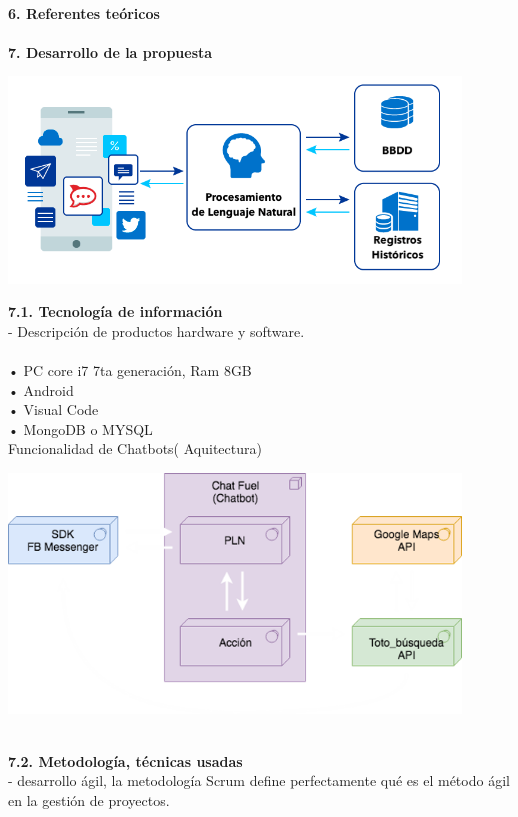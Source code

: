 \begin{flushleft}
\begin{itemize}
\textbf{ }\\

\textbf{6.      Referentes teóricos}\\
\textbf{ }\\
\textbf{7.      Desarrollo de la propuesta}\\

\begin{center}
	\includegraphics[width=12cm]{./Imagenes/nlp} 
	\end{center}
\textbf{7.1.   Tecnología de información}\\
-	Descripción de productos hardware y software.\\ 
\textbf{ }\\

•	PC core i7 7ta generación, Ram 8GB \\
•	Android \\
•	Visual Code\\
•	MongoDB o MYSQL\\
Funcionalidad de Chatbots( Aquitectura)
\begin{center}
	\includegraphics[width=12cm]{./Imagenes/api} 
	\end{center}

\textbf{ }\\
\textbf{7.2.   Metodología, técnicas usadas }\\
-	 desarrollo ágil, la metodología Scrum define perfectamente qué es el método ágil en la gestión de proyectos.


\end{itemize}
\end{flushleft}
